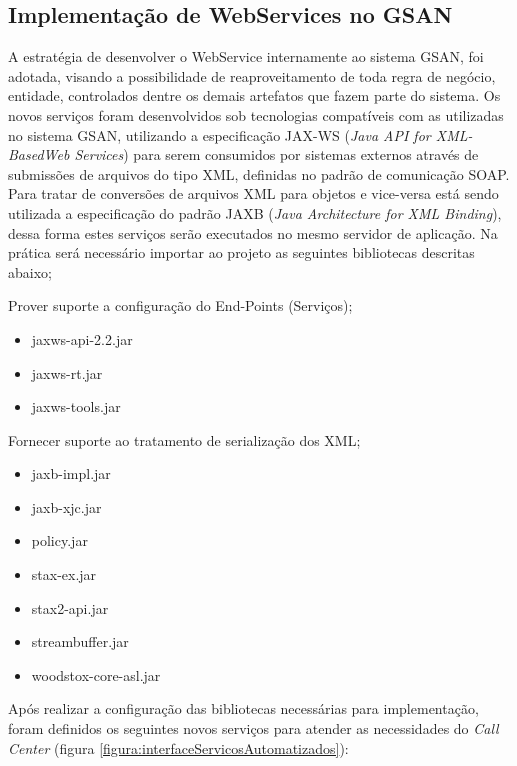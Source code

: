 \subsection{Implementação de WebServices no GSAN}

A estratégia de desenvolver o WebService internamente ao sistema GSAN, foi adotada, visando a possibilidade de reaproveitamento de toda regra de negócio, entidade, controlados dentre os demais artefatos que fazem parte do sistema.  Os novos serviços foram desenvolvidos sob tecnologias compatíveis com as utilizadas no sistema GSAN, utilizando a especificação JAX-WS (\textit{Java API for XML-BasedWeb Services}) para serem consumidos por sistemas externos através de submissões de arquivos do tipo XML, definidas no padrão de comunicação SOAP. Para tratar de conversões de arquivos XML para objetos e vice-versa está sendo utilizada a especificação do padrão JAXB (\textit{Java Architecture for XML Binding}), dessa forma estes serviços serão executados no mesmo servidor de aplicação.
Na prática será necessário importar ao projeto as seguintes bibliotecas descritas abaixo;

\begin{description}
	\item Prover suporte a configuração do End-Points (Serviços);
	\begin{itemize}
		\item jaxws-api-2.2.jar
		\item jaxws-rt.jar
		\item jaxws-tools.jar		
	\end{itemize}
	\item Fornecer suporte ao tratamento de serialização dos XML;
	\begin{itemize}
		\item jaxb-impl.jar
		\item jaxb-xjc.jar
		\item policy.jar
		\item stax-ex.jar
		\item stax2-api.jar
		\item streambuffer.jar
		\item woodstox-core-asl.jar		
	\end{itemize}
\end{description}

Após realizar a configuração das bibliotecas necessárias para implementação, foram definidos os seguintes novos serviços para atender as necessidades do \textit{Call Center} (figura \ref{figura:interfaceServicosAutomatizados}):

